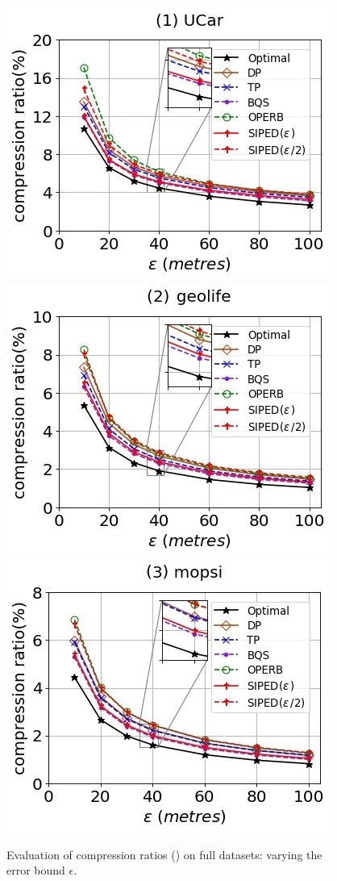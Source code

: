 \begin{figure}[tb!]
	\centering
	\includegraphics[scale=0.500]{Figures/Exp-PED-CR-epsilon-service.jpg} 	\hspace{2ex}
	\includegraphics[scale=0.500]{Figures/Exp-PED-CR-epsilon-geolife.jpg}	\hspace{2ex}
	\includegraphics[scale=0.500]{Figures/Exp-PED-CR-epsilon-mopsi.jpg}		
	\vspace{-2ex}
	\caption{\small Evaluation of compression ratios (\ped) on full datasets: varying the error bound $\epsilon$.}
	\label{fig:cr-ped-epsilon}
	\vspace{-2ex}
\end{figure}
